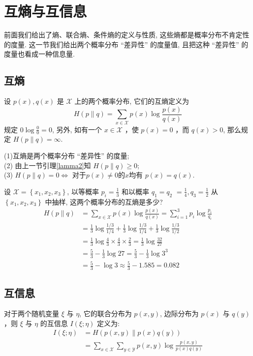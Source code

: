 \section{互熵与互信息}
前面我们给出了熵、联合熵、条件熵的定义与性质, 这些熵都是概率分布不肯定性的度量. 这一节我们给出两个概率分布 “差异性” 的度量值, 且把这种 “差异性” 的度量也看成一种信息量.

\subsection{互熵}
\begin{definition}
    设 $ p(x), q(x) $ 是 $ \mathscr{X} $ 上的两个概率分布, 它们的互熵定义为
$$
H(p \| q)=\sum_{x \in \mathscr{X}} p(x) \log \frac{p(x)}{q(x)}
$$
规定 $ 0 \log \frac{0}{0}=0 $, 另外, 如有一个 $ x \in \mathscr{X} $ ，使 $ p(x)=0 $ ，而 $ q(x)>0 $, 那么规定 $ H(p \| q)=\infty $.
\end{definition}
 \begin{remark}
     (1)互熵是两个概率分布 “差异性” 的度量;\\
(2) 由上一节引理\ref{lamma2}知 $ H(p \| q) \geqslant 0 $;\\
(3) $ H(p \| q)=0 \Leftrightarrow$ 对于$p(x) \neq 0 $的$x$均有 $p(x)=q(x)$.
 \end{remark}
\begin{example}
设 $ \mathscr{X}=\left\{x_{1}, x_{2}, x_{3}\right\} $, 以等概率 $ p_{i}=\frac{1}{3} $ 和以概率 $ q_{1}=q_{2} $ $ =\frac{1}{4}, q_{3}=\frac{1}{2} $ 从 $ \left\{x_{1}, x_{2}, x_{3}\right\} $ 中抽样, 这两个概率分布的互熵是多少?
$$
\begin{aligned}
H(p \| q) & =\sum_{x \in \mathscr{X}} p(x) \log \frac{p(x)}{q(x)}=\sum_{i=1}^{3} p_{i} \log \frac{p_{i}}{q_{i}} \\
& =\frac{1}{3} \log \frac{1 / 3}{1 / 4}+\frac{1}{3} \log \frac{1 / 3}{1 / 4}+\frac{1}{3} \log \frac{1 / 3}{1 / 2} \\
& =\frac{1}{3} \log \frac{4}{3} \times \frac{4}{3} \times \frac{2}{3}=\frac{1}{3} \log \frac{32}{27} \\
& =\frac{5}{3}-\frac{1}{3} \log 27=\frac{5}{3}-\frac{1}{3} \log 3^{3} \\
& =\frac{5}{3}-\log 3 \approx \frac{5}{3}-1.585=0.082
\end{aligned}
$$
\end{example}

\subsection{互信息}
\begin{definition}
    对于两个随机变量 $ \xi $ 与 $ \eta $, 它的联合分布为 $ p(x, y) $, 边际分布为 $ p(x) $ 与 $ q(y) $ ，则 $ \xi $ 与 $ \eta $ 的互信息 $ I(\xi ; \eta) $ 定义为:
$$
\begin{aligned}
I(\xi ; \eta) & =H(p(x, y) \| p(x) q(y)) \\
& =\sum_{x \in \mathscr{X}} \sum_{y \in \mathscr{Y}} p(x, y) \log \frac{p(x, y)}{p(x) q(y)}
\end{aligned}
$$
\end{definition}

